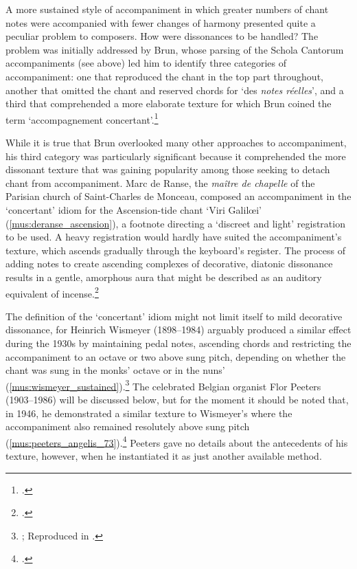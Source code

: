 A more sustained style of accompaniment in which greater numbers of chant notes were accompanied with fewer changes of harmony presented quite a peculiar problem to composers.
How were dissonances to be handled?
\label{sc:brun}%
The problem was initially addressed by Brun, whose parsing of the Schola Cantorum accompaniments (see  above) led him to identify three categories of accompaniment: one that reproduced the chant in the top part throughout, another that omitted the chant and reserved chords for `des \emph{notes réelles}', and a third that comprehended a more elaborate texture for which Brun coined the term `accompagnement concertant'.\footcites[19--20]{BrunTraiteaccompagnementchant1912}[Discussed in][56]{DelSordomonemicanellaccompagnamento2000}

While it is true that Brun overlooked many other approaches to accompaniment, his third category was particularly significant because it comprehended the more dissonant texture that was gaining popularity among those seeking to detach chant from accompaniment.
Marc de Ranse, the \emph{maître de chapelle} of the Parisian church of Saint-Charles de Monceau, composed an accompaniment in the `concertant' idiom for the Ascension-tide chant `Viri Galil\oe{}i' (\cref{mus:deranse_ascension}), a footnote directing a `discreet and light' registration to be used.
A heavy registration would hardly have suited the accompaniment's texture, which ascends gradually through the keyboard's register.
The process of adding notes to create ascending complexes of decorative, diatonic dissonance results in a gentle, amorphous aura that might be described as an auditory equivalent of incense.\footcites[14]{DeRanseSupplementIntroitJeudi1909}[Re-printed in][54--5]{BrunTraiteaccompagnementchant1912}

The definition of the `concertant' idiom might not limit itself to mild decorative dissonance, for Heinrich Wismeyer (1898--1984) arguably produced a similar effect during the 1930s by maintaining pedal notes, ascending chords and restricting the accompaniment to an octave or two above sung pitch, depending on whether the chant was sung in the monks' octave or in the nuns' (\cref{mus:wismeyer_sustained}).\footnote{\covid{}\cite{WismeyerOrgelbegleitungChoralgesangen1933}; Reproduced in \cite[118]{Potierartaccompagnementchant1946}.}
The celebrated Belgian organist Flor Peeters (1903--1986) will be discussed below, but for the moment it should be noted that, in 1946, he demonstrated a similar texture to Wismeyer's where the accompaniment also remained resolutely above sung pitch (\cref{mus:peeters_angelis_73}).\footcite[73]{PeetersPracticalMethodPlainChant1949}
Peeters gave no details about the antecedents of his texture, however, when he instantiated it as just another available method.

